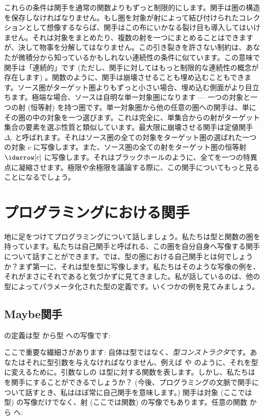 \noindent
これらの条件は関手を通常の関数よりもずっと制限的にします。関手は圏の構造を保存しなければなりません。もし圏を対象が射によって結び付けられたコレクションとして想像するならば、関手はこの布にいかなる裂け目も導入してはいけません。それは対象をまとめたり、複数の射を一つにまとめることはできますが、決して物事を分解してはなりません。この引き裂きを許さない制約は、あなたが微積分から知っているかもしれない連続性の条件に似ています。この意味で関手は「連続的」です (ただし、関手に対してはもっと制限的な連続性の概念が存在します) 。関数のように、関手は崩壊させることも埋め込むこともできます。ソース圏がターゲット圏よりもずっと小さい場合、埋め込む側面がより目立ちます。極端な場合、ソースは自明な単一対象圏になります --- 一つの対象と一つの射 (恒等射) を持つ圏です。単一対象圏から他の任意の圏への関手は、単にその圏の中の対象を一つ選びます。これは完全に、単集合からの射がターゲット集合の要素を選ぶ性質と類似しています。最大限に崩壊させる関手は定値関手 $\Delta_c$ と呼ばれます。それはソース圏の全ての対象をターゲット圏の選ばれた一つの対象 $c$ に写像します。また、ソース圏の全ての射をターゲット圏の恒等射 $\idarrow[c]$ に写像します。それはブラックホールのように、全てを一つの特異点に凝縮させます。極限や余極限を議論する際に、この関手についてもっと見ることになるでしょう。

\section{プログラミングにおける関手}

地に足をつけてプログラミングについて話しましょう。私たちは型と関数の圏を持っています。私たちは自己関手と呼ばれる、この圏を自分自身へ写像する関手について話すことができます。では、型の圏における自己関手とは何でしょうか？まず第一に、それは型を型に写像します。私たちはそのような写像の例を、それがまさにそれであると気づかずに見てきました。私が話しているのは、他の型によってパラメータ化された型の定義です。いくつかの例を見てみましょう。

\subsection{Maybe関手}

の定義は型  から型  への写像です: 

ここで重要な繊細さがあります: 自体は型ではなく、\emph{型コンストラクタ}です。あなたはそれに型引数を与えなければなりません、例えば  や  のように、それを型に変えるために。引数なしの  は型に対する関数を表します。しかし、私たちは  を関手にすることができるでしょうか？ (今後、プログラミングの文脈で関手について話すとき、私はほぼ常に自己関手を意味します。) 関手は対象 (ここでは型) の写像だけでなく、射 (ここでは関数) の写像でもあります。任意の関数  から  へ: 


